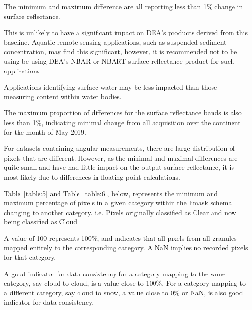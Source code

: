 \documentclass[a4paper]{article}
\begin{document}
      \begin{flushleft}
        The minimum and maximum difference are all reporting less than 1\% change in surface reflectance. \par
        This is unlikely to have a significant impact on DEA's products derived from this baseline. Aquatic remote sensing applications, such as suspended sediment concentration, may find this significant, however, it is recommended not to be using be using DEA's NBAR or NBART surface reflectance product for such applications. \par
        Applications identifying surface water may be less impacted than those measuring content within water bodies. \par
        The maximum proportion of differences for the surface reflectance bands is also less than 1\%, indicating minimal change from all acquisition over the continent for the month of May 2019. \par
        For datasets containing angular measurements, there are large distribution of pixels that are different. However, as the minimal and maximal differences are quite small and have had little impact on the output surface reflectance, it is most likely due to differences in floating point calculations.
      \end{flushleft}

      \begin{flushleft}
        Table~\ref{table:5} and Table~\ref{table:6}, below, represents the minimum and maximum percentage of pixels in a given category within the Fmask schema changing to another category. i.e. Pixels originally classified as Clear and now being classified as Cloud. \par
        A value of 100 represents 100\%, and indicates that all pixels from all granules mapped entirely to the corresponding category. A NaN implies no recorded pixels for that category. \par
        A good indicator for data consistency for a category mapping to the same category, say cloud to cloud, is a value close to 100\%. For a category mapping to a different category, say cloud to snow, a value close to 0\% or NaN, is also good indicator for data consistency.
      \end{flushleft}

  \clearpage
\end{document}
